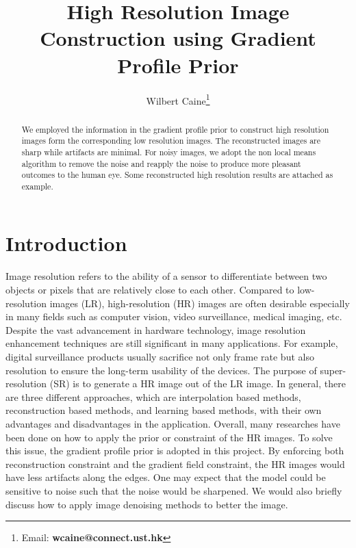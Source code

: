 \documentclass[a4paper,11pt]{article}
\title{High Resolution Image Construction using Gradient Profile Prior}
\author{
Wilbert Caine\thanks{Email: {\bf wcaine@connect.ust.hk}}
}
\begin{document}
\thispagestyle{plain}
\maketitle


\begin{abstract}
We employed the information in the gradient profile prior to construct high resolution images form the corresponding low resolution images. The reconstructed images are sharp while artifacts are minimal. For noisy images, we adopt the non local means algorithm to remove the noise and reapply the noise to produce more pleasant outcomes to the human eye. Some reconstructed high resolution results are attached as example.
\end{abstract}

\section{Introduction}
Image resolution refers to the ability of a sensor to differentiate between two objects or pixels that are relatively close to each other. Compared to low-resolution images (LR), high-resolution (HR) images are often desirable especially in many fields such as computer vision, video surveillance, medical imaging, etc. Despite the vast advancement in hardware technology, image resolution enhancement techniques are still significant in many applications. For example, digital surveillance products usually sacrifice not only frame rate but also resolution to ensure the long-term usability of the devices\cite{in16}. The purpose of super-resolution (SR) is to generate a HR image out of the LR image. In general, there are three different approaches, which are interpolation based methods, reconstruction based methods, and learning based methods, with their own advantages and disadvantages in the application\cite{sr11}. Overall, many researches have been done on how to apply the prior or constraint of the HR images. To solve this issue, the gradient profile prior\cite{sr11} is adopted in this project. By enforcing both reconstruction constraint and the gradient field constraint, the HR images would have less artifacts along the edges. One may expect that the model could be sensitive to noise such that the noise would be sharpened. We would also briefly discuss how to apply image denoising methods to better the image.
\end{document}
